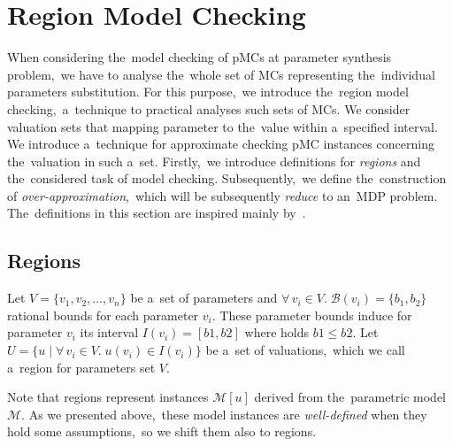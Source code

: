 
\section{Region Model Checking} \label{sec:regional_model}
When considering the~model checking of pMCs at parameter synthesis problem,~we have to analyse the~whole set of MCs representing the~individual parameters substitution. 
For this purpose,~we introduce the~region model checking,~a~technique to practical analyses such sets of MCs.
We consider valuation sets that mapping parameter to the~value within a~specified interval. 
We introduce a~technique for approximate checking pMC instances concerning the~valuation in such a~set.
Firstly,~we introduce definitions for \textit{regions} and the~considered task of model checking.
Subsequently,~we define the~construction of \textit{over-approximation},~which will be subsequently \textit{reduce} to an~MDP problem.
The~definitions in this section are inspired mainly by~\cite{Quatmann2016}.

\subsection{Regions}
\begin{definition}[Region]
Let $V = \{ v_1, v_2, \dots, v_n \}$ be a~set of parameters and $\forall \, v_i \in V. \; \mathcal{B}(v_i) = \{b_1, b_2 \}$ rational bounds for each parameter $v_i$.
These parameter bounds induce for parameter $v_i$ its interval $I(v_i) = [b1, b2]$ where holds $b1 \leq b2$.
Let $U = \{ u \; \lvert \; \forall \, v_i \in V. \; u(v_i) \in I(v_i) \}$ be a~set of valuations,~which we call a~region for parameters set $V$.
\end{definition}
\noindent
Note that regions represent instances $\mathcal{M}[u]$ derived from the~parametric model $\mathcal{M}$.
As we presented above,~these model instances are \textit{well-defined} when they hold some assumptions,~so we shift them also to regions.

